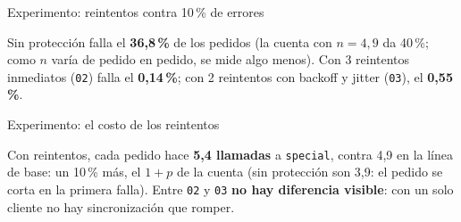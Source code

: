 \documentclass[institutional,screen,none]{ua-engineering-v6-beamer}
\begin{document}
\begin{frame}{Experimento: reintentos contra 10\,\% de errores}

{\footnotesize Sin protección falla el \textbf{36,8\,\%} de los pedidos (la cuenta con $n = 4{,}9$ da 40\,\%; como $n$ varía de pedido en pedido, se mide algo menos). Con 3 reintentos inmediatos (\texttt{02}) falla el \textbf{0,14\,\%}; con 2 reintentos con backoff y jitter (\texttt{03}), el \textbf{0,55\,\%}.}
\end{frame}

\begin{frame}{Experimento: el costo de los reintentos}

{\footnotesize Con reintentos, cada pedido hace \textbf{5,4 llamadas} a \texttt{special}, contra 4,9 en la línea de base: un 10\,\% más, el $1 + p$ de la cuenta (sin protección son 3,9: el pedido se corta en la primera falla). Entre \texttt{02} y \texttt{03} \textbf{no hay diferencia visible}: con un solo cliente no hay sincronización que romper.}
\end{frame}

\end{document}
